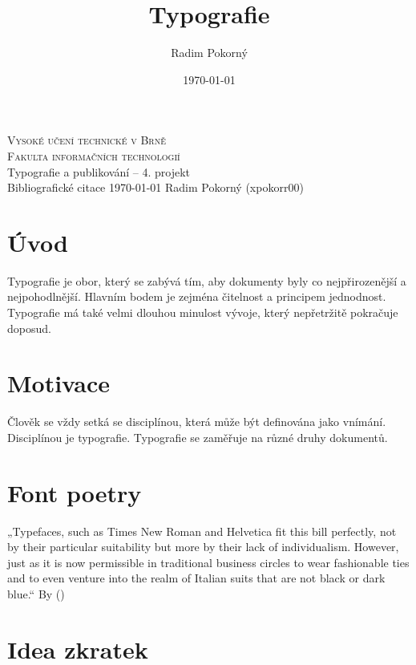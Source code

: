 \documentclass[12pt]{article}
\title{Typografie }
\author{Radim Pokorný}
\date{\today}
\begin{document}
\begin{titlepage}
    \begin{center}
        {\Huge\textsc{Vysoké učení technické v Brně}\\}
        \vspace{0.5em}
        {\huge \textsc{Fakulta informačních technologií}\\}
        \vfill
        \vspace{-5cm}
        {\LARGE Typografie a publikování – 4. projekt\\}
        \vspace{0.6em}
        {\Huge Bibliografické citace}
        \vfill
        \Large{\today} \hfill \Large{Radim Pokorný (xpokorr00)}
    \end{center}
\end{titlepage}

\section*{Úvod}

Typografie je obor, který se zabývá tím, aby dokumenty byly co nejpřirozenější a nejpohodlnější. 
Hlavním bodem je zejména čitelnost a principem jednodnost. Typografie má také velmi dlouhou minulost 
vývoje, který nepřetržitě pokračuje doposud.

\section*{Motivace}

Člověk se vždy setká se
disciplínou, která může být definována jako vnímání. Disciplínou je typografie.
Typografie se zaměřuje na různé
druhy dokumentů. \cite{typografie_odborny_text_2020}

\section*{Font poetry}

„Typefaces, such as Times New Roman and Helvetica
fit this bill perfectly, not by their particular suitability but
more by their lack of individualism.
However, just as it is now permissible in traditional business circles to wear fashionable ties and to
even venture into the realm of Italian suits that are
not black or dark blue.“ By \citeauthor{stop_sheep_find_type2014} (\citeyear{stop_sheep_find_type2014}) 

\section*{Idea zkratek}
\end{document}
